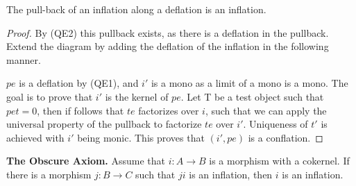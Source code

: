     \begin{corollary}
        The pull-back of an inflation along a deflation is an inflation.
        \begin{center}
        \end{center}
    \end{corollary}

    \begin{proof}
        By (QE2) this pullback exists, as there is a deflation in the pullback. Extend the diagram by adding the deflation of the inflation in the following manner.
        \begin{center}
        \end{center}
        $pe$ is a deflation by (QE1), and $i'$ is a mono as a limit of a mono is a mono. The goal is to prove that $i'$ is the kernel of $pe$. Let T be a test object such that $pet=0$, then if follows that $te$ factorizes over $i$, such that we can apply the universal property of the pullback to factorize $te$ over $i'$. Uniqueness of $t'$ is achieved with $i'$ being monic. This proves that $(i',pe)$ is a conflation.
    \end{proof}

    \begin{theorem}
        \textbf{The Obscure Axiom.} Assume that $i:A\rightarrow B$ is a morphism with a cokernel. If there is a morphism $j:B\rightarrow C$ such that $ji$ is an inflation, then $i$ is an inflation.
    \end{theorem}

